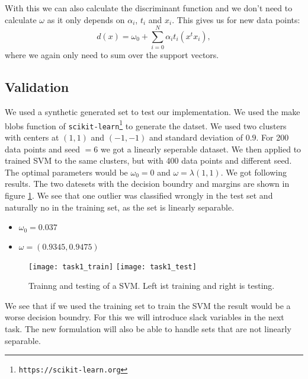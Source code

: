 With this we can also calculate the discriminant function and we don't need to calculate $\omega$ as it only depends on $\alpha_i$, $t_i$ and $x_i$. This gives us for new data points:
\[
	d(x) = \omega_0 + \sum_{i=0}^N\alpha_it_i(x^tx_i),
\]
where we again only need to sum over the support vectors.
\subsection{Validation}

We used a synthetic generated set to test our implementation. We used the make blobs function of \texttt{scikit-learn\footnote{https://scikit-learn.org}} to generate the datset. We used two clusters with centers at $(1,1)$ and $(-1,-1)$ and standard deviation of $0.9$. For 200 data points and seed $=6$ we got a linearly seperable dataset. We then applied to trained SVM to the same clusters, but with 400 data points and different seed. The optimal parameters would be $\omega_0 = 0$ and $\omega = \lambda (1,1)$. We got following results. The two datesets with the decision boundry and margins are shown in figure \ref{task1::svm}. We see that one outlier was classified wrongly in the test set and naturally no in the training set, as the set is linearly separable.
\begin{itemize}
	\item $\omega_0 = 0.037$
	\item $\omega = (0.9345, 0.9475)$
\end{itemize}
\begin{figure}
	\texttt{[image: task1\_train]}
	\texttt{[image: task1\_test]}
	\caption{Trainng and testing of a SVM. Left ist training and right is testing.}
	\label{task1::svm}
\end{figure}

We see that if we used the training set to train the SVM the result would be a worse decision boundry. For this we will introduce slack variables in the next task. The new formulation will also be able to handle sets that are not linearly separable.
